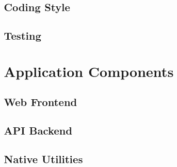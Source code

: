\subsection{Coding Style}

\subsection{Testing}

\section{Application Components}

\subsection{Web Frontend}

\subsection{API Backend}

\subsection{Native Utilities}
